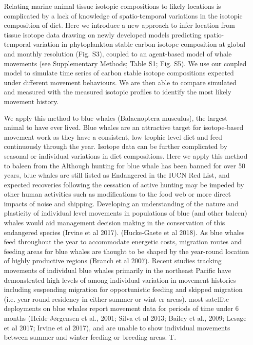 \documentclass[a4paper,12pt]{article}
\begin{document}
Relating marine animal tissue isotopic compositions to likely locations is complicated by a lack of knowledge of spatio-temporal variations in the isotopic composition of diet. Here we introduce a new approach to infer location from tissue isotope data drawing on newly developed models predicting spatio-temporal variation in phytoplankton stable carbon isotope composition at global and monthly resolution (Fig. S3), coupled to an agent-based model of whale movements (see Supplementary Methods; Table S1; Fig. S5).  We use our coupled model to simulate time series of carbon stable isotope compositions expected under different movement behaviours. We are then able to compare simulated and measured with the measured isotopic profiles to identify the most likely movement history. 

We apply this method to blue whales (Balaenoptera musculus), the largest animal to have ever lived. Blue whales are an attractive target for isotope-based movement work as they have a consistent, low trophic level diet and feed continuously through the year. Isotope data can be further complicated by seasonal or individual variations in diet compositions.
Here we apply this method to baleen from the Although hunting for blue whale has been banned for over 50 years, blue whales are still listed as Endangered in the IUCN Red List, and expected recoveries following the cessation of active hunting may be impeded by other human activities such as modifications to the food web or more direct impacts of noise and shipping.   Developing an understanding of the nature and plasticity of individual level movements in populations of blue (and other baleen) whales would aid management decision making in the conservation of this endangered species (Irvine et al 2017).   
 (Hucke-Gaete et al 2018). As blue whales feed throughout the year to accommodate energetic costs, migration routes and feeding areas for blue whales are thought to be shaped by the year-round location of highly productive regions (Branch et al 2007). Recent studies tracking movements of individual blue whales primarily in the northeast Pacific have demonstrated high levels of among-individual variation in movement histories including suspending migration for opportunistic feeding and skipped migration (i.e. year round residency in either summer or wint
er areas). most satellite deployments on blue whales report movement data for periods of time under 6 months (Heide-Jørgensen et al., 2001; Silva et al 2013; Bailey et al., 2009; Lesage et al 2017; Irvine et al 2017), and are unable to show individual movements between summer and winter feeding or breeding areas. T. 
\end{document}

